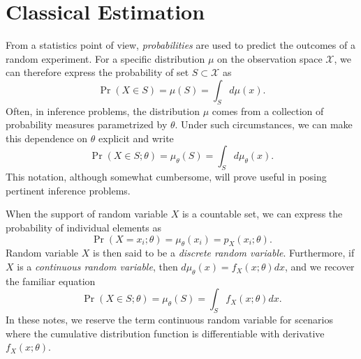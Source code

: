 \chapter{Classical Estimation}


From a statistics point of view, \emph{probabilities} are used to predict the outcomes of a random experiment.
For a specific distribution $\mu$ on the observation space $\mathcal{X}$, we can therefore express the probability of set $S \subset \mathcal{X}$ as
\begin{equation*}
\Pr (X \in S) = \mu (S) = \int_S d\mu (x) .
\end{equation*}
Often, in inference problems, the distribution $\mu$ comes from a collection of probability measures parametrized by $\theta$.
Under such circumstances, we can make this dependence on $\theta$ explicit and write
\begin{equation*}
\Pr (X \in S ; \theta) = \mu_{\theta} (S) = \int_S d\mu_{\theta}(x) .
\end{equation*}
This notation, although somewhat cumbersome, will prove useful in posing pertinent inference problems.

When the support of random variable $X$ is a countable set, we can express the probability of individual elements as
\begin{equation*}
\Pr (X = x_i; \theta) = \mu_{\theta} (x_i) = p_{X} (x_i ; \theta) .
\end{equation*}
Random variable $X$ is then said to be a \emph{discrete random variable}.
Furthermore, if $X$ is a \emph{continuous random variable}, then $d\mu_{\theta} (x) = f_X (x ; \theta) dx$, and we recover the familiar equation
\begin{equation*}
\Pr (X \in S ; \theta) = \mu_{\theta} (S) = \int_{S} f_X (x; \theta) dx .
\end{equation*}
In these notes, we reserve the term continuous random variable for scenarios where the cumulative distribution function is differentiable with derivative $f_X (x; \theta)$.

